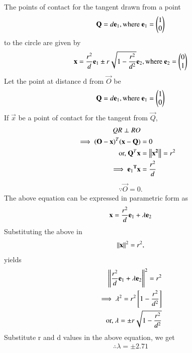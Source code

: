 \documentclass[journal,12pt,twocolumn]{IEEEtran}
\begin{document}
\begin{lemma}
\label{lemma}
The points of contact for the tangent drawn from a point 
\begin{align}
\vec{Q}=d\vec{e\textsubscript{1}},
\text{where }\vec{e\textsubscript{1}}=\myvec{1\\0} \label{2.0.1}
\end{align}
to the circle are given by 
\begin{align}
 \vec{x}=\frac{r^2}{d}\vec{e\textsubscript{1}}\pm r\sqrt{1-\frac{r^2}{d^2}}\vec{e\textsubscript{2}}, \text{where }\vec{e\textsubscript{2}}=\myvec{0\\1} \label{2.0.2}
\end{align}
Let the point at distance d from $\vec{O}$ be
\begin{align}
   \vec{Q}=d\vec{e\textsubscript{1}},
\text{where }\vec{e\textsubscript{1}}=\myvec{1\\0} 
\end{align}
If $\vec{x}$ be a point of contact for the tangent from $\vec{Q}$,
\begin{align}
QR \perp RO
\\
 \implies (\vec{O}-\vec{x})^T (\vec{x}-\vec{Q}) &= 0
 \\
  \text{or, }\vec{Q}^T\vec{x} &=\norm{\vec{x^2}} = r^2 
 \\
 \implies \vec{e\textsubscript{1}^T}\vec{x} &= \frac{r^2}{d} 
\end{align}
\begin{align}
\because \vec{O}= 0.
\end{align}
The above equation can be expressed in parametric form as 
\begin{align}
    \vec{x}=\frac{r^2}{d}\vec{e\textsubscript{1}}+\lambda\vec{e\textsubscript{2}} \label{2.0.9}
\end{align}
Substituting the above in
\begin{align}
    \norm{\vec{x}}^2 =r^2,
\end{align}
yields
\begin{align}
    \norm{\frac{r^2}{d}\vec{e\textsubscript{1}}+\lambda\vec{e\textsubscript{2}}}^2 =r^2
    \\
    \implies\lambda^2= r^2\sbrak{1-\frac{r^2}{d^2}}
    \\
    \text{or, }\lambda =\pm r\sqrt{1-\frac{r^2}{d^2}}
\end{align}
Substitute r and d values in the above equation, we get
\begin{align}
    \therefore \lambda= \pm 2.71
 \end{align}

\end{lemma}
\end{document}
